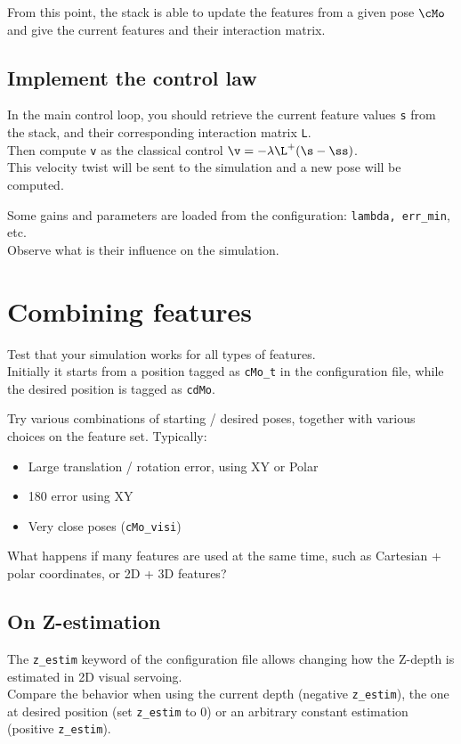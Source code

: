 \documentclass{ecnreport}
\begin{document}
From this point, the stack is able to update the features from a given pose $\cMo$ and give the current features and their interaction matrix.

\subsection{Implement the control law}

In the main control loop, you should retrieve the current feature values \texttt{s} from the stack, and their corresponding interaction matrix \texttt{L}.\\
Then compute \texttt{v} as the classical control $\v = -\lambda\L^+(\s-\ss)$.\\

This velocity twist will be sent to the simulation and a new pose will be computed.

Some gains and parameters are loaded from the configuration: \texttt{lambda, err\_min}, etc.\\
Observe what is their influence on the simulation.

\section{Combining features}

Test that your simulation works for all types of features. \\

Initially it starts from a position tagged as \texttt{cMo\_t} in the configuration file, while the desired position is tagged as \texttt{cdMo}.

Try various combinations of starting / desired poses, together with various choices on the feature set. Typically:
\begin{itemize}
 \item Large translation / rotation error, using XY or Polar
 \item 180 error using XY
 \item Very close poses (\texttt{cMo\_visi})
\end{itemize}


What happens if many features are used at the same time, such as Cartesian + polar coordinates, or 2D + 3D features?

\subsection{On Z-estimation}

The \texttt{z\_estim} keyword of the configuration file allows changing how the Z-depth is estimated in 2D visual servoing.\\
Compare the behavior when using the current depth (negative \texttt{z\_estim}), the one at desired position (set \texttt{z\_estim} to 0) or an arbitrary constant estimation (positive \texttt{z\_estim}).
\end{document}
